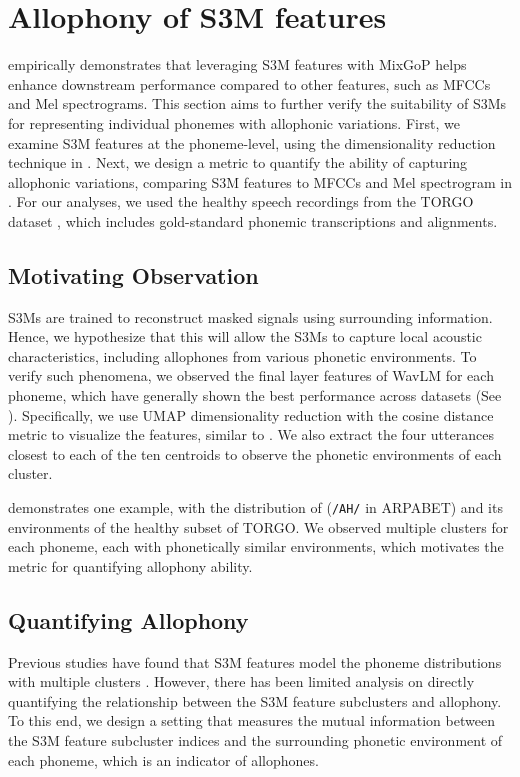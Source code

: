 \section{Allophony of S3M features}\label{sec:motiv}
 empirically demonstrates that leveraging S3M features with MixGoP helps enhance downstream performance compared to other features, such as MFCCs and Mel spectrograms.
This section aims to further verify the suitability of S3Ms for representing individual phonemes with allophonic variations.
First, we examine S3M features at the phoneme-level, using the dimensionality reduction technique in .
Next, we design a metric to quantify the ability of capturing allophonic variations, comparing S3M features to MFCCs and Mel spectrogram in .
For our analyses, we used the healthy speech recordings from the TORGO dataset \citep{rudzicz2012torgo}, which includes gold-standard phonemic transcriptions and alignments.


\subsection{Motivating Observation}\label{subsec:motiv_qual}
S3Ms are trained to reconstruct masked signals using surrounding information.
Hence, we hypothesize that this will allow the S3Ms to capture local acoustic characteristics, including allophones from various phonetic environments.
To verify such phenomena, we observed the final layer features of WavLM for each phoneme, which have generally shown the best performance across datasets (See ).
Specifically, we use UMAP dimensionality reduction \citep{mcinnes2018umap} with the cosine distance metric to visualize the features, similar to \citet{choi2022opening}.
We also extract the four utterances closest to each of the ten centroids to observe the phonetic environments of each cluster. 


 demonstrates one example, with the distribution of  (\texttt{/AH/} in ARPABET) and its environments of the healthy subset of TORGO.
We observed multiple clusters for each phoneme, each with phonetically similar environments, which motivates the metric for quantifying allophony ability.


\subsection{Quantifying Allophony}\label{subsec:motiv_quant}
Previous studies have found that S3M features model the phoneme distributions with multiple clusters \citep{wells22_interspeech,martin23_interspeech}.
However, there has been limited analysis on directly quantifying the relationship between the S3M feature subclusters and allophony.
To this end, we design a setting that measures the mutual information between the S3M feature subcluster indices and the surrounding phonetic environment of each phoneme, which is an indicator of allophones.


